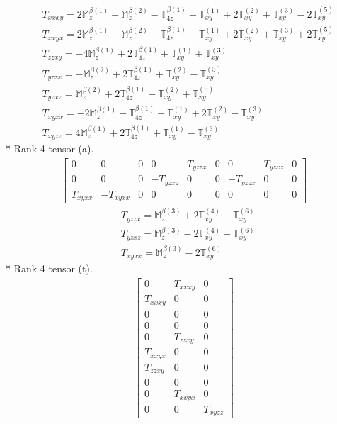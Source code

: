 \documentclass[fleqn,8pt,landscape]{jsarticle}
\begin{document}
\begin{align*}
& T_{xxxy} = 2 \mathbb{M}_{z}^{\beta(1)} + \mathbb{M}_{z}^{\beta(2)} - \mathbb{T}_{4z}^{\beta(1)} + \mathbb{T}_{xy}^{(1)} + 2 \mathbb{T}_{xy}^{(2)} + \mathbb{T}_{xy}^{(3)} - 2 \mathbb{T}_{xy}^{(5)} \\
& T_{xxyx} = 2 \mathbb{M}_{z}^{\beta(1)} - \mathbb{M}_{z}^{\beta(2)} - \mathbb{T}_{4z}^{\beta(1)} + \mathbb{T}_{xy}^{(1)} + 2 \mathbb{T}_{xy}^{(2)} + \mathbb{T}_{xy}^{(3)} + 2 \mathbb{T}_{xy}^{(5)} \\
& T_{zzxy} = - 4 \mathbb{M}_{z}^{\beta(1)} + 2 \mathbb{T}_{4z}^{\beta(1)} + \mathbb{T}_{xy}^{(1)} + \mathbb{T}_{xy}^{(3)} \\
& T_{yzzx} = - \mathbb{M}_{z}^{\beta(2)} + 2 \mathbb{T}_{4z}^{\beta(1)} + \mathbb{T}_{xy}^{(2)} - \mathbb{T}_{xy}^{(5)} \\
& T_{yzxz} = \mathbb{M}_{z}^{\beta(2)} + 2 \mathbb{T}_{4z}^{\beta(1)} + \mathbb{T}_{xy}^{(2)} + \mathbb{T}_{xy}^{(5)} \\
& T_{xyxx} = - 2 \mathbb{M}_{z}^{\beta(1)} - \mathbb{T}_{4z}^{\beta(1)} + \mathbb{T}_{xy}^{(1)} + 2 \mathbb{T}_{xy}^{(2)} - \mathbb{T}_{xy}^{(3)} \\
& T_{xyzz} = 4 \mathbb{M}_{z}^{\beta(1)} + 2 \mathbb{T}_{4z}^{\beta(1)} + \mathbb{T}_{xy}^{(1)} - \mathbb{T}_{xy}^{(3)}
\end{align*}
* Rank 4 tensor (a).
\begin{align*}
\begin{bmatrix} 0 & 0 & 0 & 0 & T_{yzzx} & 0 & 0 & T_{yzxz} & 0 \\ 0 & 0 & 0 & - T_{yzxz} & 0 & 0 & - T_{yzzx} & 0 & 0 \\ T_{xyxx} & - T_{xyxx} & 0 & 0 & 0 & 0 & 0 & 0 & 0 \end{bmatrix}
\end{align*}
\begin{align*}
& T_{yzzx} = \mathbb{M}_{z}^{\beta(3)} + 2 \mathbb{T}_{xy}^{(4)} + \mathbb{T}_{xy}^{(6)} \\
& T_{yzxz} = \mathbb{M}_{z}^{\beta(3)} - 2 \mathbb{T}_{xy}^{(4)} + \mathbb{T}_{xy}^{(6)} \\
& T_{xyxx} = \mathbb{M}_{z}^{\beta(3)} - 2 \mathbb{T}_{xy}^{(6)}
\end{align*}
* Rank 4 tensor (t).
\begin{align*}
\begin{bmatrix} 0 & T_{xxxy} & 0 \\ T_{xxxy} & 0 & 0 \\ 0 & 0 & 0 \\ 0 & 0 & 0 \\ 0 & T_{zzxy} & 0 \\ T_{xxyx} & 0 & 0 \\ T_{zzxy} & 0 & 0 \\ 0 & 0 & 0 \\ 0 & T_{xxyx} & 0 \\ 0 & 0 & T_{xyzz} \end{bmatrix}
\end{align*}
\end{document}
